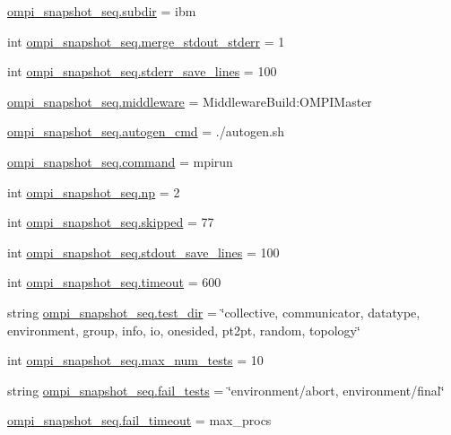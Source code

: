 \begin{DoxyCompactItemize}
\item 
\hyperlink{namespaceompi__snapshot__seq_a9d517656629849b65e1dcefbcf9cfd73}{ompi\-\_\-snapshot\-\_\-seq.\-subdir} = ibm
\item 
int \hyperlink{namespaceompi__snapshot__seq_ad98d5c78e44526c2b86baccb081cd46e}{ompi\-\_\-snapshot\-\_\-seq.\-merge\-\_\-stdout\-\_\-stderr} = 1
\item 
int \hyperlink{namespaceompi__snapshot__seq_a4c1170c00e6cc51822262da67c07d721}{ompi\-\_\-snapshot\-\_\-seq.\-stderr\-\_\-save\-\_\-lines} = 100
\item 
\hyperlink{namespaceompi__snapshot__seq_a25acb4b0e7bb13ac146f46ae7f074689}{ompi\-\_\-snapshot\-\_\-seq.\-middleware} = Middleware\-Build\-:\-O\-M\-P\-I\-Master
\item 
\hyperlink{namespaceompi__snapshot__seq_a2e5939b3a3bd4bacecb7b4b33cad0313}{ompi\-\_\-snapshot\-\_\-seq.\-autogen\-\_\-cmd} = ./autogen.\-sh
\item 
\hyperlink{namespaceompi__snapshot__seq_a7ee776e6bd84fc7f42f758751ba25e1e}{ompi\-\_\-snapshot\-\_\-seq.\-command} = mpirun
\item 
int \hyperlink{namespaceompi__snapshot__seq_ac5c6ca602093f9742f1afbfc100f8cfd}{ompi\-\_\-snapshot\-\_\-seq.\-np} = 2
\item 
int \hyperlink{namespaceompi__snapshot__seq_a7261e8a10955a8c08df3d642714fb626}{ompi\-\_\-snapshot\-\_\-seq.\-skipped} = 77
\item 
int \hyperlink{namespaceompi__snapshot__seq_a0521277c015b3e1b74418fc58101d5d6}{ompi\-\_\-snapshot\-\_\-seq.\-stdout\-\_\-save\-\_\-lines} = 100
\item 
int \hyperlink{namespaceompi__snapshot__seq_a4a2554fd9d8c0df86eeaae67f5bc6867}{ompi\-\_\-snapshot\-\_\-seq.\-timeout} = 600
\item 
string \hyperlink{namespaceompi__snapshot__seq_ae15b0abc55bc72ce7a7a4ebe56fc2dfe}{ompi\-\_\-snapshot\-\_\-seq.\-test\-\_\-dir} = \char`\"{}collective, communicator, datatype, environment, group, info, io, onesided, pt2pt, random, topology\char`\"{}
\item 
int \hyperlink{namespaceompi__snapshot__seq_a8c173774cc05394e996dbb13e37d0322}{ompi\-\_\-snapshot\-\_\-seq.\-max\-\_\-num\-\_\-tests} = 10
\item 
string \hyperlink{namespaceompi__snapshot__seq_a1c6caf43d8724d112db736b1cc590bef}{ompi\-\_\-snapshot\-\_\-seq.\-fail\-\_\-tests} = \char`\"{}environment/abort, environment/final\char`\"{}
\item 
\hyperlink{namespaceompi__snapshot__seq_ac68ac424f71d3b098f0e5742e90083c1}{ompi\-\_\-snapshot\-\_\-seq.\-fail\-\_\-timeout} = max\-\_\-procs

\end{DoxyCompactItemize}
